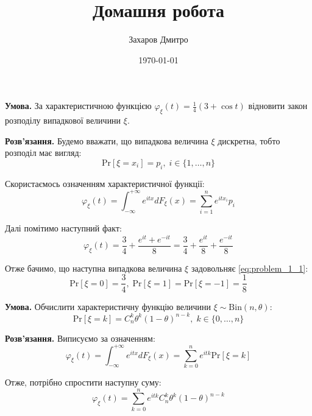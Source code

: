 \documentclass[oneside,solution]{karazin-prob-theory-assign}
\title{Домашня робота}
\author{Захаров Дмитро}
\date{\today}
\begin{document}
\maketitle



\hspace{20px}\textbf{Умова.} За характеристичною функцією $\varphi_{\xi}(t) = \frac{1}{4}(3 + \cos t)$ відновити закон розподілу випадкової величини $\xi$.

\textbf{Розв'язання.} Будемо вважати, що випадкова величина $\xi$ дискретна, тобто розподіл має вигляд:
\begin{equation}
    \text{Pr}[\xi = x_i] = p_i, \; i \in \{1,\dots,n\}
\end{equation}

Скористаємось означенням характеристичної функції:
\begin{equation}\label{eq:problem_1_1}
    \varphi_{\xi}(t) = \int_{-\infty}^{+\infty}e^{itx}dF_{\xi}(x) = \sum_{i=1}^n e^{itx_i}p_i
\end{equation}

Далі помітимо наступний факт:
\begin{equation}
    \varphi_{\xi}(t) = \frac{3}{4} + \frac{e^{it}+e^{-it}}{8} = \frac{3}{4} + \frac{e^{it}}{8} + \frac{e^{-it}}{8}
\end{equation}

Отже бачимо, що наступна випадкова величина $\xi$ задовольняє \ref{eq:problem_1_1}:
\begin{equation}
    \text{Pr}[\xi=0] = \frac{3}{4}, \; \text{Pr}[\xi=1] = \text{Pr}[\xi=-1] = \frac{1}{8}
\end{equation}


\hspace{20px}\textbf{Умова.} Обчислити характеристичну функцію величини $\xi \sim \text{Bin}(n,\theta)$:
\begin{equation}
    \text{Pr}[\xi=k] = C_n^k \theta^k(1-\theta)^{n-k}, \; k \in \{0,\dots,n\}
\end{equation}

\textbf{Розв'язання.} Виписуємо за означенням:
\begin{equation}
    \varphi_{\xi}(t) = \int_{-\infty}^{+\infty}e^{itx}dF_{\xi}(x) = \sum_{k=0}^{n}e^{itk}\text{Pr}[\xi=k]
\end{equation}

Отже, потрібно спростити наступну суму:
\begin{equation}
    \varphi_{\xi}(t) = \sum_{k=0}^n e^{itk}C_n^k \theta^k (1-\theta)^{n-k}
\end{equation}
\end{document}
